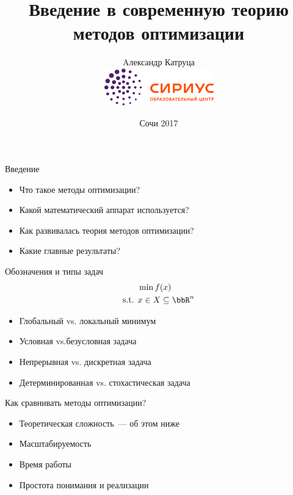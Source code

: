 \documentclass[12pt]{beamer}
\begin{document}
\title[]{Введение в современную теорию \\ методов оптимизации}

\author[А. Катруца]{Aлександр Катруца \\[0.9cm] 
\includegraphics[scale=0.5]{logo_sirius}}

\date{Сочи 2017}
\begin{frame}
\maketitle
\end{frame}

\begin{frame}{Введение}

\begin{itemize}
\item Что такое методы оптимизации?
\item Какой математический аппарат используется?
\item Как развивалась теория методов оптимизации?
\item Какие главные результаты?
\end{itemize}

\end{frame}

\begin{frame}{Обозначения и типы задач}
\begin{equation*}
\begin{split}
& \min f(x)\\
\text{s.t. } & x \in X \subseteq \bbR^n
\end{split}
\end{equation*}

\begin{itemize}
\item Глобальный vs. локальный минимум
\item Условная vs.безусловная задача
\item Непрерывная vs. дискретная задача
\item Детерминированная vs. стохастическая задача
\end{itemize}
\end{frame}

\begin{frame}{Как сравнивать методы оптимизации?}
\begin{itemize}
\item Теоретическая сложность~--- об этом ниже
\item Масштабируемость
\item Время работы
\item Простота понимания и реализации
\end{itemize}
\end{frame}
\end{document}
